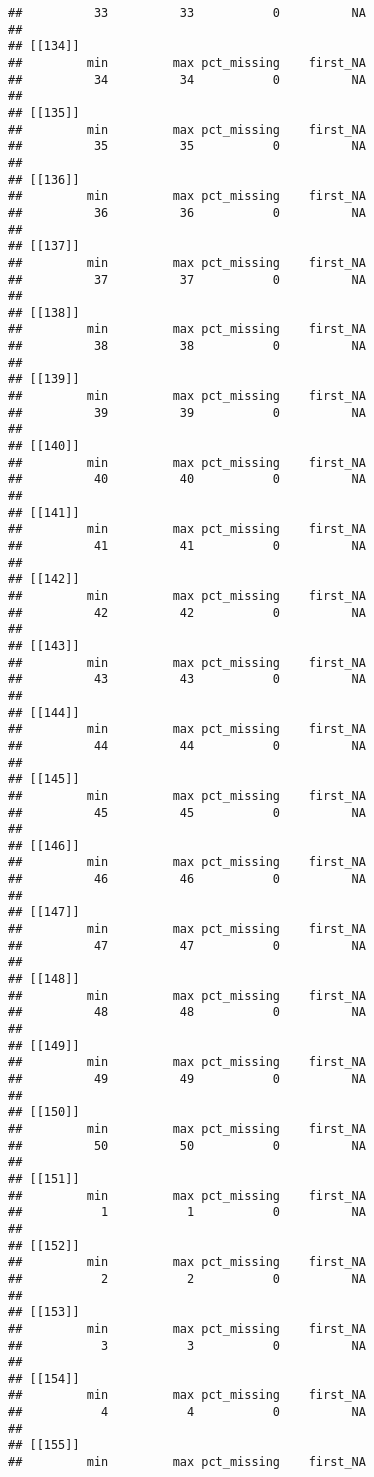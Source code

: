 \documentclass[
]{article}
\begin{document}
\begin{verbatim}
##          33          33           0          NA 
## 
## [[134]]
##         min         max pct_missing    first_NA 
##          34          34           0          NA 
## 
## [[135]]
##         min         max pct_missing    first_NA 
##          35          35           0          NA 
## 
## [[136]]
##         min         max pct_missing    first_NA 
##          36          36           0          NA 
## 
## [[137]]
##         min         max pct_missing    first_NA 
##          37          37           0          NA 
## 
## [[138]]
##         min         max pct_missing    first_NA 
##          38          38           0          NA 
## 
## [[139]]
##         min         max pct_missing    first_NA 
##          39          39           0          NA 
## 
## [[140]]
##         min         max pct_missing    first_NA 
##          40          40           0          NA 
## 
## [[141]]
##         min         max pct_missing    first_NA 
##          41          41           0          NA 
## 
## [[142]]
##         min         max pct_missing    first_NA 
##          42          42           0          NA 
## 
## [[143]]
##         min         max pct_missing    first_NA 
##          43          43           0          NA 
## 
## [[144]]
##         min         max pct_missing    first_NA 
##          44          44           0          NA 
## 
## [[145]]
##         min         max pct_missing    first_NA 
##          45          45           0          NA 
## 
## [[146]]
##         min         max pct_missing    first_NA 
##          46          46           0          NA 
## 
## [[147]]
##         min         max pct_missing    first_NA 
##          47          47           0          NA 
## 
## [[148]]
##         min         max pct_missing    first_NA 
##          48          48           0          NA 
## 
## [[149]]
##         min         max pct_missing    first_NA 
##          49          49           0          NA 
## 
## [[150]]
##         min         max pct_missing    first_NA 
##          50          50           0          NA 
## 
## [[151]]
##         min         max pct_missing    first_NA 
##           1           1           0          NA 
## 
## [[152]]
##         min         max pct_missing    first_NA 
##           2           2           0          NA 
## 
## [[153]]
##         min         max pct_missing    first_NA 
##           3           3           0          NA 
## 
## [[154]]
##         min         max pct_missing    first_NA 
##           4           4           0          NA 
## 
## [[155]]
##         min         max pct_missing    first_NA 

\end{verbatim}
\end{document}
